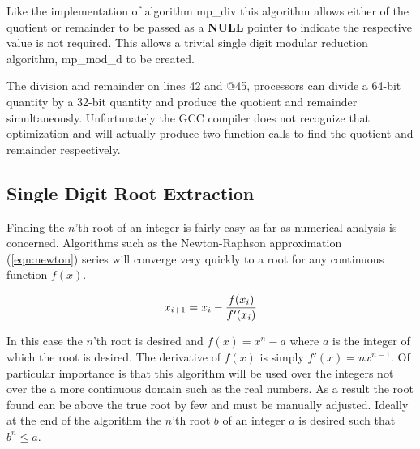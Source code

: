 \documentclass[b5paper]{book}
\begin{document}
Like the implementation of algorithm mp\_div this algorithm allows either of the quotient or remainder to be passed as a \textbf{NULL} pointer to
indicate the respective value is not required.  This allows a trivial single digit modular reduction algorithm, mp\_mod\_d to be created.

The division and remainder on lines 42 and @45,%
processors can divide a 64-bit quantity by a 32-bit quantity and produce the quotient and remainder simultaneously.  Unfortunately the GCC 
compiler does not recognize that optimization and will actually produce two function calls to find the quotient and remainder respectively.  

\subsection{Single Digit Root Extraction}

Finding the $n$'th root of an integer is fairly easy as far as numerical analysis is concerned.  Algorithms such as the Newton-Raphson approximation 
(\ref{eqn:newton}) series will converge very quickly to a root for any continuous function $f(x)$.  

\begin{equation}
x_{i+1} = x_i - {f(x_i) \over f'(x_i)}
\label{eqn:newton}
\end{equation}

In this case the $n$'th root is desired and $f(x) = x^n - a$ where $a$ is the integer of which the root is desired.  The derivative of $f(x)$ is 
simply $f'(x) = nx^{n - 1}$.  Of particular importance is that this algorithm will be used over the integers not over the a more continuous domain
such as the real numbers.  As a result the root found can be above the true root by few and must be manually adjusted.  Ideally at the end of the 
algorithm the $n$'th root $b$ of an integer $a$ is desired such that $b^n \le a$.  
\end{document}
